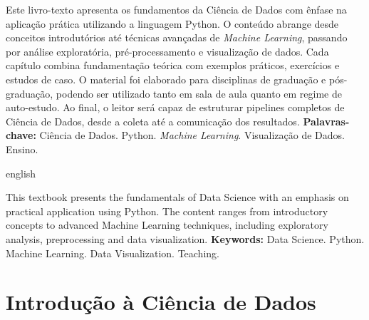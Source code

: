 \documentclass[
    12pt,
    oneside,
    a4paper,
    english,
    brazilian
    ]{abntex2}
\numberwithin{equation}{chapter}
\begin{document}
\pretextual
\maketitle
\newpage

\begin{resumo}
\noindent Este livro-texto apresenta os fundamentos da Ciência de Dados com ênfase na aplicação prática utilizando a linguagem Python. O conteúdo abrange desde conceitos introdutórios até técnicas avançadas de \textit{Machine Learning}, passando por análise exploratória, pré-processamento e visualização de dados. Cada capítulo combina fundamentação teórica com exemplos práticos, exercícios e estudos de caso. O material foi elaborado para disciplinas de graduação e pós-graduação, podendo ser utilizado tanto em sala de aula quanto em regime de auto-estudo. Ao final, o leitor será capaz de estruturar pipelines completos de Ciência de Dados, desde a coleta até a comunicação dos resultados. 
\newline
\noindent \textbf{Palavras-chave:} Ciência de Dados. Python. \textit{Machine Learning}. Visualização de Dados. Ensino.
\end{resumo}

\begin{otherlanguage*}{english}
\begin{resumo}[Abstract]
\noindent This textbook presents the fundamentals of Data Science with an emphasis on practical application using Python. The content ranges from introductory concepts to advanced Machine Learning techniques, including exploratory analysis, preprocessing and data visualization. 
\newline
\noindent \textbf{Keywords:} Data Science. Python. Machine Learning. Data Visualization. Teaching.
\end{resumo}
\end{otherlanguage*}
\newpage

\listoffigures*
\newpage

\listoftables*
\newpage

\textual

\chapter{Introdução à Ciência de Dados}
\end{document}
